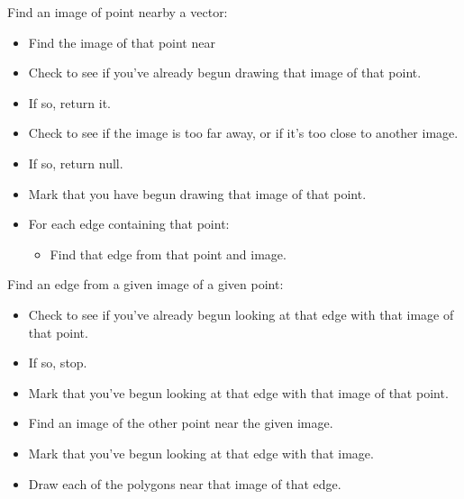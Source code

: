\documentclass[12pt]{amsart}
\newcommand{\ignore}[1]{}
\begin{document}
\ignore{
The frame begins with the program asking for an image near $(0,0,0)$ of a point. When a point is drawn, the program automatically checks every edge that contains that point as an endpoint to see if it started drawing it yet. If not, it records that it has begun the process of drawing an edge that contains that image of that point, finds the image of the other endpoint.

???
}
Find an image of point nearby a vector:

\begin{itemize}

\item Find the image of that point near 

\item Check to see if you've already begun drawing that image of that point.

\item If so, return it.

\item Check to see if the image is too far away, or if it's too close to another image.

\item If so, return null.

\item Mark that you have begun drawing that image of that point.

\item For each edge containing that point:

\begin{itemize}


\item Find that edge from that point and image.

\end{itemize}

\end{itemize}

\bigskip

Find an edge from a given image of a given point:

\begin{itemize}

\item Check to see if you've already begun looking at that edge with that image of that point.

\item If so, stop.

\item Mark that you've begun looking at that edge with that image of that point.

\item Find an image of the other point near the given image.

\item Mark that you've begun looking at that edge with that image.

\item Draw each of the polygons near that image of that edge.

\end{itemize}
\end{document}
